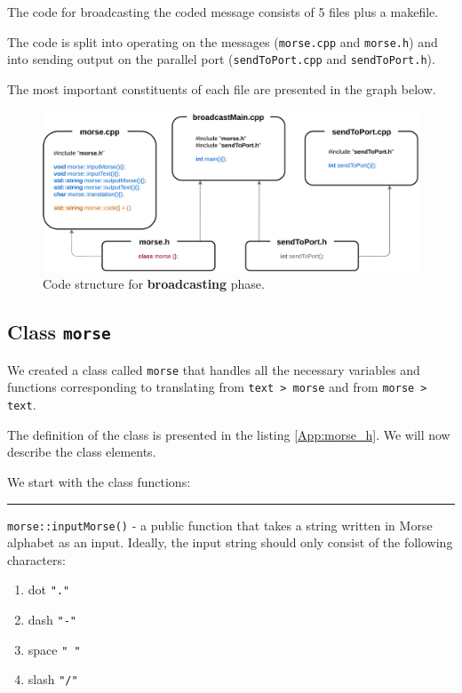 \documentclass[12pt]{report}
\begin{document}
The code for broadcasting the coded message consists of 5 files plus a makefile. 

The code is split into operating on the messages (\verb|morse.cpp| and \verb|morse.h|) and into sending output on the parallel port (\verb|sendToPort.cpp| and \verb|sendToPort.h|).

The most important constituents of each file are presented in the graph below.

\begin{figure}[H]
\centering\includegraphics[scale=0.12]{bCodeStructure}
\caption{Code structure for \textbf{broadcasting} phase.}				
\label{fig:br_code}
\end{figure}




\subsection{Class \texttt{morse}}

We created a class called \verb|morse| that handles all the necessary variables and functions corresponding to translating from \verb|text > morse| and from \verb|morse > text|.

The definition of the class is presented in the listing \ref{App:morse_h}. We will now describe the class elements.

We start with the class functions:

\rule{\textwidth}{0.5pt}

\verb|morse::inputMorse()| - a public function that takes a string written in Morse alphabet as an input. Ideally, the input string should only consist of the following characters:

\begin{enumerate}
\item dot \verb|"."|

\item dash \verb|"-"|

\item space \verb|" "|

\item slash \verb|"/"|
\end{enumerate}
\end{document}

